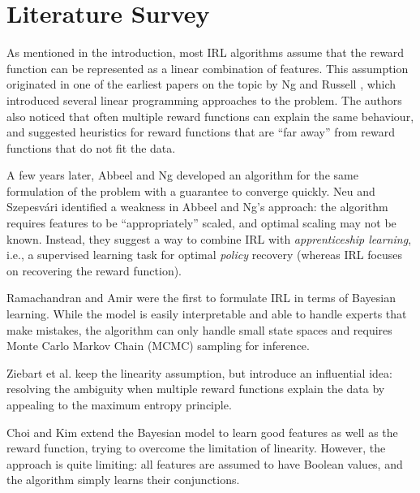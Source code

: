 \documentclass{mprop}
\theoremstyle{definition}
\begin{document}
\section{Literature Survey} \label{literature}

As mentioned in the introduction, most IRL algorithms assume that the reward
function can be represented as a linear combination of features. This assumption
originated in one of the earliest papers on the topic by Ng and Russell
\cite{DBLP:conf/icml/NgR00}, which introduced several linear programming
approaches to the problem. The authors also noticed that often
multiple reward functions can explain the same behaviour, and suggested
heuristics for reward functions that are ``far away'' from reward functions that
do not fit the data.

A few years later, Abbeel and Ng \cite{DBLP:conf/icml/PieterN04} developed an
algorithm for the same formulation of the problem with a guarantee to converge
quickly. Neu and Szepesv\'ari \cite{DBLP:conf/uai/NeuS07} identified a weakness
in Abbeel and Ng's approach: the algorithm requires features to be
``appropriately'' scaled, and optimal scaling may not be known. Instead, they
suggest a way to combine IRL with \emph{apprenticeship learning}, i.e., a
supervised learning task for optimal \emph{policy} recovery (whereas IRL focuses
on recovering the reward function).

Ramachandran and Amir \cite{DBLP:conf/ijcai/RamachandranA07} were the first to
formulate IRL in terms of Bayesian learning. While the model is easily
interpretable and able to handle experts that make mistakes, the algorithm can
only handle small state spaces and requires Monte Carlo Markov Chain (MCMC)
sampling for inference.

Ziebart et al. \cite{ziebart2008maximum} keep the linearity assumption, but
introduce an influential idea: resolving the ambiguity when multiple reward
functions explain the data by appealing to the maximum entropy principle.

Choi and Kim \cite{DBLP:conf/ijcai/ChoiK13} extend the Bayesian model to learn
good features as well as the reward function, trying to overcome the limitation
of linearity. However, the approach is quite limiting: all features are assumed
to have Boolean values, and the algorithm simply learns their conjunctions.
\end{document}

